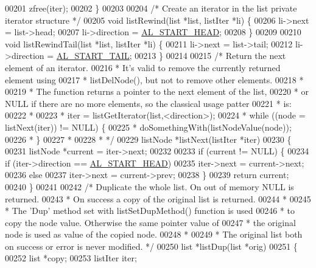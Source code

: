 \begin{DoxyCode}
00201     zfree(iter);
00202 \}
00203 
00204 \textcolor{comment}{/* Create an iterator in the list private iterator structure */}
00205 \textcolor{keywordtype}{void} listRewind(list *list, listIter *li) \{
00206     li->next = list->head;
00207     li->direction = \hyperlink{adlist_8h_a353f032fdd7e66abe9f194fa7c89560b}{AL\_START\_HEAD};
00208 \}
00209 
00210 \textcolor{keywordtype}{void} listRewindTail(list *list, listIter *li) \{
00211     li->next = list->tail;
00212     li->direction = \hyperlink{adlist_8h_a7d37e2046bb8d302b8ca5de4883a1c7f}{AL\_START\_TAIL};
00213 \}
00214 
00215 \textcolor{comment}{/* Return the next element of an iterator.}
00216 \textcolor{comment}{ * It's valid to remove the currently returned element using}
00217 \textcolor{comment}{ * listDelNode(), but not to remove other elements.}
00218 \textcolor{comment}{ *}
00219 \textcolor{comment}{ * The function returns a pointer to the next element of the list,}
00220 \textcolor{comment}{ * or NULL if there are no more elements, so the classical usage patter}
00221 \textcolor{comment}{ * is:}
00222 \textcolor{comment}{ *}
00223 \textcolor{comment}{ * iter = listGetIterator(list,<direction>);}
00224 \textcolor{comment}{ * while ((node = listNext(iter)) != NULL) \{}
00225 \textcolor{comment}{ *     doSomethingWith(listNodeValue(node));}
00226 \textcolor{comment}{ * \}}
00227 \textcolor{comment}{ *}
00228 \textcolor{comment}{ * */}
00229 listNode *listNext(listIter *iter)
00230 \{
00231     listNode *current = iter->next;
00232 
00233     \textcolor{keywordflow}{if} (current != NULL) \{
00234         \textcolor{keywordflow}{if} (iter->direction == \hyperlink{adlist_8h_a353f032fdd7e66abe9f194fa7c89560b}{AL\_START\_HEAD})
00235             iter->next = current->next;
00236         \textcolor{keywordflow}{else}
00237             iter->next = current->prev;
00238     \}
00239     \textcolor{keywordflow}{return} current;
00240 \}
00241 
00242 \textcolor{comment}{/* Duplicate the whole list. On out of memory NULL is returned.}
00243 \textcolor{comment}{ * On success a copy of the original list is returned.}
00244 \textcolor{comment}{ *}
00245 \textcolor{comment}{ * The 'Dup' method set with listSetDupMethod() function is used}
00246 \textcolor{comment}{ * to copy the node value. Otherwise the same pointer value of}
00247 \textcolor{comment}{ * the original node is used as value of the copied node.}
00248 \textcolor{comment}{ *}
00249 \textcolor{comment}{ * The original list both on success or error is never modified. */}
00250 list *listDup(list *orig)
00251 \{
00252     list *copy;
00253     listIter iter;

\end{DoxyCode}
